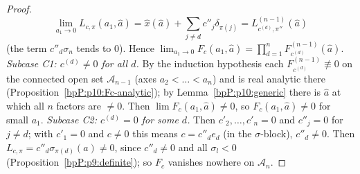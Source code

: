 \begin{proof}
\[\lim_{a_1\to0}L_{c,\pi}(a_1,\hat a)=\hat x(\hat a)+\sum_{j\ne d}c''_j\delta_{\pi(j)}=L^{(n-1)}_{c^{(d)},\pi''}(\hat a)\]
(the term $c''_d\sigma_n$ tends to $0$). Hence $\lim_{a_1\to0}F_c(a_1,\hat a)=\prod_{d=1}^nF^{(n-1)}_{c^{(d)}}(\hat a)$.
\emph{Subcase C1: $c^{(d)}\ne0$ for all $d$.} By the induction hypothesis each $F^{(n-1)}_{c^{(d)}}\not\equiv0$ on the connected open set $\mathcal A_{n-1}$ (axes $a_2<\dots<a_n$) and is real analytic there (Proposition~\ref{bpP:p10:Fc-analytic}); by Lemma~\ref{bpP:p10:generic} there is $\hat a$ at which all $n$ factors are $\ne0$. Then $\lim F_c(a_1,\hat a)\ne0$, so $F_c(a_1,\hat a)\ne0$ for small $a_1$.
\emph{Subcase C2: $c^{(d)}=0$ for some $d$.} Then $c'_{2},\dots,c'_n=0$ and $c''_j=0$ for $j\ne d$; with $c'_1=0$ and $c\ne0$ this means $c=c''_de_d$ (in the $\sigma$-block), $c''_d\ne0$. Then $L_{c,\pi}=c''_d\sigma_{\pi(d)}(a)\ne0$, since $c''_d\ne0$ and all $\sigma_l<0$ (Proposition~\ref{bpP:p9:definite}); so $F_c$ vanishes nowhere on $\mathcal A_n$.
\end{proof}

